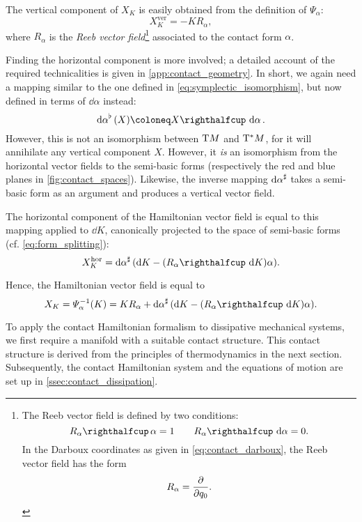The vertical component of $X_K$ is easily obtained from the definition of $\Psi_\alpha$:
\begin{equation}
    X_K^\text{ver} = -K R_\alpha,
    \label{eq:vertical_vf}
\end{equation}
where $R_\alpha$ is the \emph{Reeb vector field}\footnote{
    The Reeb vector field is defined by two conditions: \cite{Libermann1987}
        $$ \intpr{R_\alpha}{\alpha} = 1 \qquad \intpr{R_\alpha}{\dd{\alpha}} = 0.$$
    In the Darboux coordinates as given in \cref{eq:contact_darboux}, the Reeb vector field has the form
        $$ R_\alpha = \pdv{}{q_0}. $$} 
associated to the contact form $\alpha$.

Finding the horizontal component is more involved; a detailed account of the required technicalities is given in \cref{app:contact_geometry}. In short, we again need a mapping similar to the one defined in \cref{eq:symplectic_isomorphism}, but now defined in terms of $\dd{\alpha}$ instead:
\begin{equation}
    \toDual{\dd{\alpha}}(X) \coloneq \intpr{X}{\dd{\alpha}}.
    \label{eq:contact_isomorphism}
\end{equation}
However, this is not an isomorphism between $\mathrm{T}M$ and $\mathrm{T}^*M$, for it will annihilate any vertical component $X$. However, it \emph{is} an isomorphism from the horizontal vector fields to the semi-basic forms (respectively the red and blue planes in \cref{fig:contact_spaces}). Likewise, the inverse mapping $\dd{\alpha}^\sharp$ takes a semi-basic form as an argument and produces a vertical vector field. 

The horizontal component of the Hamiltonian vector field is equal to this mapping applied to $\dd{K}$, canonically projected to the space of semi-basic forms (cf. \cref{eq:form_splitting}):
\begin{equation}
    X_K^\text{hor} = \fromDual{\dd{\alpha}}\qty(\dd{K} - (\intpr{R_\alpha}{\dd{K}})\alpha).
    \label{eq:horizontal_vf}
\end{equation}

Hence, the Hamiltonian vector field is equal to
\begin{equation}
    X_K = \Psi^{-1}_\alpha(K) = K R_\alpha + \fromDual{\dd{\alpha}}\qty(\dd{K} - (\intpr{R_\alpha}{\dd{K}})\alpha).
    \label{eq:contact_hamiltonian_vf}
\end{equation}

To apply the contact Hamiltonian formalism to dissipative mechanical systems, we first require a manifold with a suitable contact structure. This contact structure is derived from the principles of thermodynamics in the next section. Subsequently, the contact Hamiltonian system and the equations of motion are set up in \cref{ssec:contact_dissipation}.

